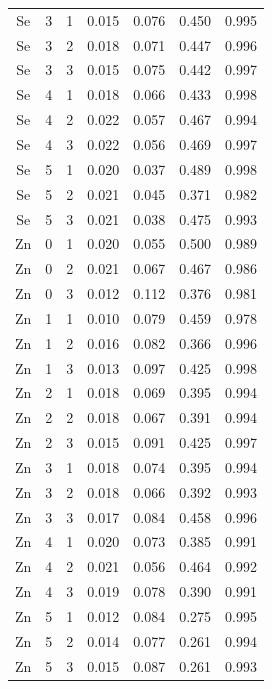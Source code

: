 \documentclass[ms, hidelinks]{uncgdissertationexp}
\theoremstyle{plain}
\theoremstyle{definition}
\theoremstyle{remark}
\begin{document}
\begin{longtable}{ccccccc}
Se & 3 & 1 & 0.015 & 0.076 & 0.450 & 0.995\\
\rowcolor{gray!6}  Se & 3 & 2 & 0.018 & 0.071 & 0.447 & 0.996\\
Se & 3 & 3 & 0.015 & 0.075 & 0.442 & 0.997\\
\rowcolor{gray!6}  Se & 4 & 1 & 0.018 & 0.066 & 0.433 & 0.998\\
Se & 4 & 2 & 0.022 & 0.057 & 0.467 & 0.994\\
\rowcolor{gray!6}  Se & 4 & 3 & 0.022 & 0.056 & 0.469 & 0.997\\
Se & 5 & 1 & 0.020 & 0.037 & 0.489 & 0.998\\
\rowcolor{gray!6}  Se & 5 & 2 & 0.021 & 0.045 & 0.371 & 0.982\\
Se & 5 & 3 & 0.021 & 0.038 & 0.475 & 0.993\\
\rowcolor{gray!6}  Zn & 0 & 1 & 0.020 & 0.055 & 0.500 & 0.989\\
Zn & 0 & 2 & 0.021 & 0.067 & 0.467 & 0.986\\
\rowcolor{gray!6}  Zn & 0 & 3 & 0.012 & 0.112 & 0.376 & 0.981\\
Zn & 1 & 1 & 0.010 & 0.079 & 0.459 & 0.978\\
\rowcolor{gray!6}  Zn & 1 & 2 & 0.016 & 0.082 & 0.366 & 0.996\\
Zn & 1 & 3 & 0.013 & 0.097 & 0.425 & 0.998\\
\rowcolor{gray!6}  Zn & 2 & 1 & 0.018 & 0.069 & 0.395 & 0.994\\
Zn & 2 & 2 & 0.018 & 0.067 & 0.391 & 0.994\\
\rowcolor{gray!6}  Zn & 2 & 3 & 0.015 & 0.091 & 0.425 & 0.997\\
Zn & 3 & 1 & 0.018 & 0.074 & 0.395 & 0.994\\
\rowcolor{gray!6}  Zn & 3 & 2 & 0.018 & 0.066 & 0.392 & 0.993\\
Zn & 3 & 3 & 0.017 & 0.084 & 0.458 & 0.996\\
\rowcolor{gray!6}  Zn & 4 & 1 & 0.020 & 0.073 & 0.385 & 0.991\\
Zn & 4 & 2 & 0.021 & 0.056 & 0.464 & 0.992\\
\rowcolor{gray!6}  Zn & 4 & 3 & 0.019 & 0.078 & 0.390 & 0.991\\
Zn & 5 & 1 & 0.012 & 0.084 & 0.275 & 0.995\\
\rowcolor{gray!6}  Zn & 5 & 2 & 0.014 & 0.077 & 0.261 & 0.994\\
Zn & 5 & 3 & 0.015 & 0.087 & 0.261 & 0.993\\*
\end{longtable}
\clearpage
\end{document}

